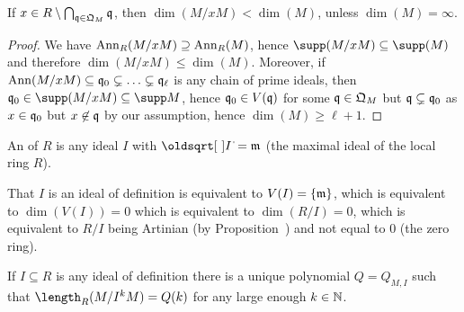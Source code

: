 \documentclass[a4paper,parskip=half,numbers=enddot, DIV=12, headheight=30pt]{scrreprt}
\begin{document}
\begin{fact}
    If $x\in R\setminus\bigcap_{\mathfrak{q}\in \mathfrak{Q}_M}\mathfrak{q}$, then $\dim(M/x M) <\dim(M)$, unless $\dim(M) =\infty$.
\end{fact}
\begin{proof}
    We have $\operatorname{Ann}_R(M/x M) \supseteq \operatorname{Ann}_R(M)$, hence $\supp (M/x M) \subseteq \supp (M)$ and therefore $\dim(M/x M) \leq \dim(M)$. Moreover, if $\operatorname{Ann}(M/x M) \subseteq \mathfrak{q}_0 \subsetneq \ldots \subsetneq \mathfrak{q}_\ell$ is any chain of prime ideals, then $\qq_0 \in \supp(M/x M)\subseteq \supp M$, hence $\mathfrak{q}_0\in V(\mathfrak{q})$ for some $\mathfrak{q}\in \mathfrak{Q}_M$ but $\mathfrak{q}\subsetneq \mathfrak{q}_0$ as $x\in \mathfrak{q}_0$ but $x\not\in \mathfrak{q}$ by our assumption, hence $\dim(M)\geq \ell+1$.
\end{proof}
\begin{defi}
    An  of $R$ is any ideal $I$ with $\sqrt{I} = \mm$ (the maximal ideal of the local ring $R$).
\end{defi}
\begin{rem*}
    That $I$ is an ideal of definition is equivalent to $V(I) = \{\mathfrak{m}\}$, which is equivalent to $\dim(V(I)) = 0$ which is equivalent to $\dim(R/I ) = 0$, which is equivalent to $R/I$ being Artinian (by Proposition~) and not equal to $0$ (the zero ring).
\end{rem*}
\begin{fact}
    If $I\subseteq R$ is any ideal of definition there is a unique polynomial $Q= Q_{M,I}$ such that $\length_R(M/I^kM) = Q(k)$ for any large enough $k\in \mathbb{N}$.
\end{fact}
\end{document}
